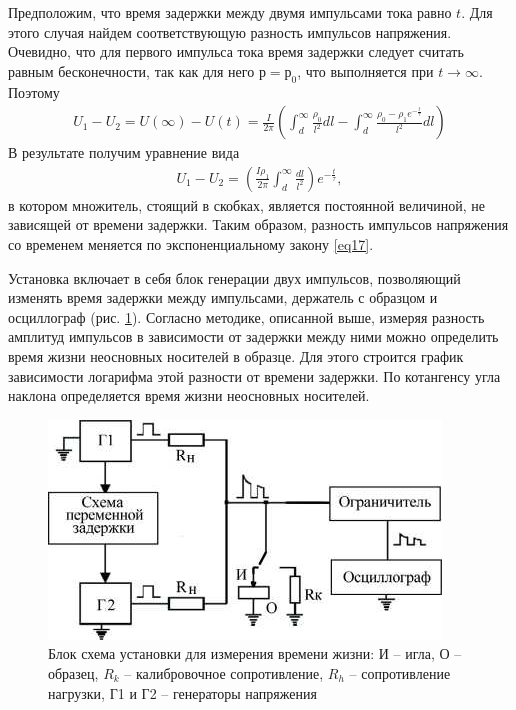 Предположим, что время задержки между двумя импульсами тока равно $t$. Для этого случая найдем соответствующую разность
импульсов напряжения. Очевидно, что для первого импульса тока время задержки следует считать равным бесконечности, так
как для него $р = р_0$, что выполняется при $t\to\infty$. Поэтому
\begin{gather}
	\label{eq21}
	U_{1}-U_{2}=U(\infty)-U(t)=\frac{I}{2 \pi}\left(\int_{d}^{\infty} \frac{\rho_{0}}{l^{2}} d l-\int_{d}^{\infty} \frac{\rho_{0}-\rho_{1} e^{-\frac{t}{\tau}}}{l^{2}} d l\right)
\end{gather}
В результате получим уравнение вида
\begin{gather}
 	\label{eq22}
 	U_{1}-U_{2}=\left(\frac{I \rho_{1}}{2 \pi} \int_{d}^{\infty} \frac{d l}{l^{2}}\right) e^{-\frac{t}{\tau}},
 \end{gather}
 в котором множитель, стоящий в скобках, является постоянной величиной, не зависящей от времени задержки. Таким образом,
 разность импульсов напряжения со временем меняется по экспоненциальному закону \eqref{eq17}.


Установка включает в себя блок генерации двух импульсов, позволяющий изменять время задержки между импульсами, держатель
с образцом и осциллограф (рис.  \ref{fig:figure11}). Согласно методике, описанной выше, измеряя разность амплитуд
импульсов в зависимости от задержки между ними можно определить время жизни неосновных носителей в образце. Для этого
строится график зависимости логарифма этой разности от времени задержки. По котангенсу угла наклона определяется время
жизни неосновных носителей.
\begin{figure}[H]
	\centering
	\includegraphics[width = 0.6\linewidth]{img/12}
	\caption{Блок схема установки для измерения времени жизни:
И -- игла, О -- образец, $R_k$ -- калибровочное сопротивление, $R_h$ -- сопротивление нагрузки, Г1 и Г2 -- генераторы напряжения }
	\label{fig:figure11}
\end{figure}


